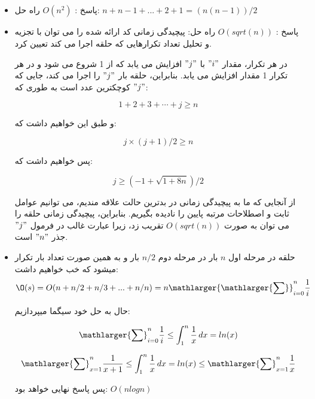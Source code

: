 \documentclass[12pt]{article}
\begin{document}
\subsection{}
\begin{itemize}
    \item پاسخ : $O(n^2)$
    راه حل: $n+n-1+...+2+1$ = $(n(n-1))/2$
    \item پاسخ : $O(sqrt(n))$
    راه حل: پیچیدگی زمانی کد ارائه شده را می توان با تجزیه و تحلیل تعداد تکرارهایی که حلقه اجرا می کند تعیین کرد.

    در هر تکرار، مقدار $"i"$ با $"j"$ افزایش می یابد که از 1 شروع می شود و در هر تکرار 1 مقدار افزایش می یابد. بنابراین، حلقه بار $"j"$ را اجرا می کند، جایی که $"j"$ کوچکترین عدد است به طوری که:

    \begin{equation}
    1 + 2 + 3 + \cdots + j \geq n
    \end{equation}

    و طبق این خواهیم داشت که:

    \begin{equation}
    j \times (j + 1) / 2 \geq n
    \end{equation}

    پس خواهیم داشت که:
    
    \begin{equation}
    j \geq (-1 + \sqrt{1 + 8n}) / 2
    \end{equation}

    از آنجایی که ما به پیچیدگی زمانی در بدترین حالت علاقه مندیم، می توانیم عوامل ثابت و اصطلاحات مرتبه پایین را نادیده بگیریم. بنابراین، پیچیدگی زمانی حلقه را می توان به صورت $O(sqrt(n))$ تقریب زد، زیرا عبارت غالب در فرمول $"j"$ جذر $"n"$ است.

    \item حلقه در مرحله اول $n$ بار در مرحله دوم $n/2$ بار و به همین صورت تعداد بار تکرار میشود که خب خواهیم داشت:
    \begin{equation}
    \O(s) = O(n+n/2+n/3+...+n/n)= n\mathlarger{\mathlarger{\sum}}_{i=0}^{n}\frac{1}{i}
    \end{equation}

    حال به حل خود سیگما میپردازیم:

    \begin{equation}
    {\mathlarger{\sum}}_{i=0}^{n}\frac{1}{i} \leq \int_{1}^{n} \frac{1}{x} \,dx = ln(x)
    \end{equation}

    \begin{equation}
    {\mathlarger{\sum}}_{x=1}^{n}\frac{1}{x+1} \leq \int_{1}^{n} \frac{1}{x} \,dx = ln(x) \leq {\mathlarger{\sum}}_{x=1}^{n}\frac{1}{x}
    \end{equation}

    پس پاسخ نهایی خواهد بود: $O(nlogn)$
\end{itemize}
\end{document}
